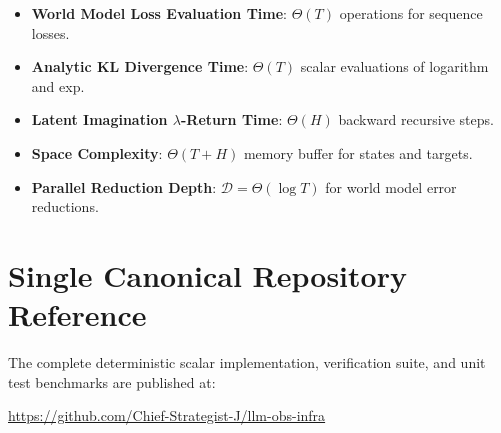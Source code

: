 \documentclass[11pt,a4paper]{article}
\theoremstyle{definition}
\begin{document}
\begin{itemize}
    \item \textbf{World Model Loss Evaluation Time}: $\Theta(T)$ operations for sequence losses.
    \item \textbf{Analytic KL Divergence Time}: $\Theta(T)$ scalar evaluations of logarithm and exp.
    \item \textbf{Latent Imagination $\lambda$-Return Time}: $\Theta(H)$ backward recursive steps.
    \item \textbf{Space Complexity}: $\Theta(T + H)$ memory buffer for states and targets.
    \item \textbf{Parallel Reduction Depth}: $\mathcal{D} = \Theta(\log T)$ for world model error reductions.
\end{itemize}

\section{Single Canonical Repository Reference}

The complete deterministic scalar implementation, verification suite, and unit test benchmarks are published at:
\begin{center}
\url{https://github.com/Chief-Strategist-J/llm-obs-infra}
\end{center}
\end{document}
